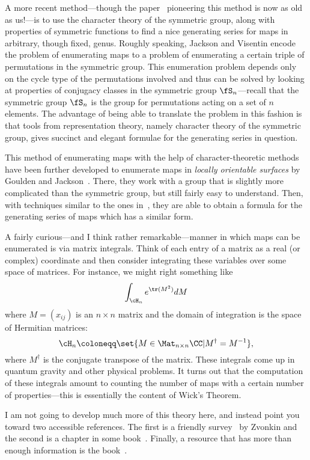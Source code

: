 \documentclass{axolotl}
\begin{document}
A more recent method---though the paper~\cite{JV} pioneering this method is now
as old as us!---is to use the character theory of the symmetric group, along
with properties of symmetric functions to find a nice generating series for
maps in arbitrary, though fixed, genus. Roughly speaking, Jackson and Visentin
encode the problem of enumerating maps to a problem of enumerating a certain
triple of permutations in the symmetric group. This enumeration problem depends
only on the cycle type of the permutations involved and thus can be solved by
looking at properties of conjugacy classes in the symmetric group
\(\fS_n\)---recall that the symmetric group \(\fS_n\) is the group for
permutations acting on a set of \(n\) elements. The advantage of being able
to translate the problem in this fashion is that tools from representation
theory, namely character theory of the symmetric group, gives succinct and
elegant formulae for the generating series in question.

This method of enumerating maps with the help of character-theoretic methods
have been further developed to enumerate maps in \emph{locally orientable
  surfaces} by Goulden and Jackson~\cite{GJ}. There, they work with a group
that is slightly more complicated than the symmetric group, but still fairly
easy to understand. Then, with techniques similar to the ones in~\cite{JV},
they are able to obtain a formula for the generating series of maps which has
a similar form.

A fairly curious---and I think rather remarkable---manner in which maps can
be enumerated is via matrix integrals. Think of each entry of a matrix as a
real (or complex) coordinate and then consider integrating these variables over
some space of matrices. For instance, we might right something like
\[ \int_{\cH_n} e^{\tr(M^2)} dM \]
where \(M = (x_{ij})\) is an \(n \times n\) matrix and the domain of integration
is the space of Hermitian matrices:
\[ \cH_n \coloneqq \set{M \in \Mat_{n \times n}\CC | M^\dagger = M^{-1}}, \]
where \(M^\dagger\) is the conjugate transpose of the matrix. These integrals
come up in quantum gravity and other physical problems. It turns out that the
computation of these integrals amount to counting the number of maps with a
certain number of properties---this is essentially the content of Wick's Theorem.

I am not going to develop much more of this theory here, and instead point
you toward two accessible references. The first is a friendly survey~\cite{Zv} by Zvonkin
and the second is a chapter in some book~\cite{Bo}. Finally, a resource that has
more than enough information is the book~\cite{LZ}.
\end{document}
